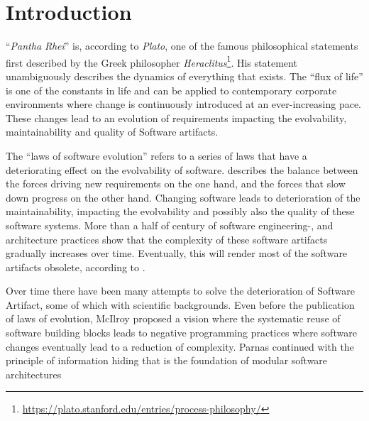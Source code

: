 \chapter{Introduction} \label{introduction}

\enquote{\emph{Pantha Rhei}} is, according to \emph{Plato}, one of the famous
philosophical statements first described by the Greek philosopher
\emph{Heraclitus}\footnote{\url{https://plato.stanford.edu/entries/process-philosophy/}}.
His statement unambiguously describes the dynamics of everything that exists. The
\enquote{flux of life} is one of the constants in life and can be applied to contemporary
corporate environments where change is continuously introduced at an ever-increasing pace.
These changes lead to an evolution of requirements impacting the evolvability,
maintainability and quality of Software artifacts.

The \enquote{laws of software evolution} \parencite[]{lehman_programs_1980} refers to a
series of laws that have a deteriorating effect on the evolvability of software.
\citeauthor{lehman_programs_1980} describes the balance between the forces driving new
requirements on the one hand, and the forces that slow down progress on the other hand.
Changing software leads to deterioration of the maintainability, impacting the
evolvability and possibly also the quality of these software systems. More than a half of
century of software engineering-, and architecture practices show that the complexity of
these software artifacts gradually increases over time. Eventually, this will render most
of the software artifacts obsolete, according to \citeauthor{lehman_programs_1980}
\parencite[]{lehman_programs_1980}.

Over time there have been many attempts to solve the deterioration of Software Artifact,
some of which with scientific backgrounds. Even before the publication of
\citeauthor{lehman_programs_1980} laws of evolution, McIlroy proposed a vision where
the systematic reuse of software building blocks leads to negative programming practices
where software changes eventually lead to a reduction of complexity. Parnas continued with
the principle of information hiding that is the foundation of modular software architectures 




